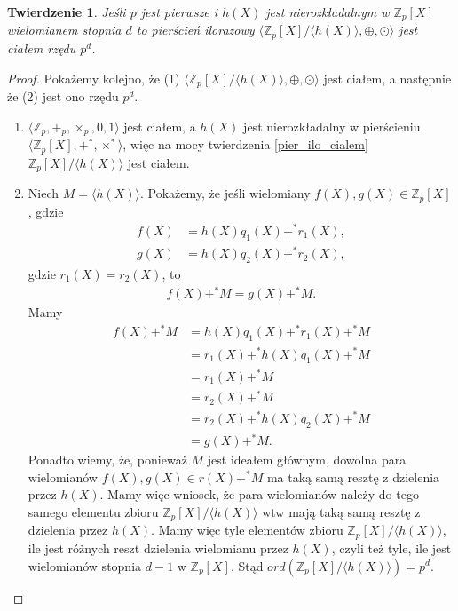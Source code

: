 \documentclass[declaration,shortabstract]{iithesis}
\theoremstyle{definition}
\theoremstyle{remark} \newtheorem{observation}{Obserwacja}
\theoremstyle{plain} \newtheorem{theorem}{Twierdzenie}
\theoremstyle{plain} \newtheorem{lemma}{Lemat}
\theoremstyle{remark} \newtheorem*{remark*}{Uwaga}
\theoremstyle{reminder} \newtheorem*{reminder*}{Przypomnienie}
\begin{document}
\begin{theorem} \label{pier_ilo_ciałem}
	Jeśli $p$ jest pierwsze i $h(X)$ jest nierozkładalnym w $\mathbb{Z}_p[X]$ wielomianem stopnia $d$ to pierścień ilorazowy $\langle \mathbb{Z}_p[X]/\langle h(X) \rangle, \oplus, \odot \rangle$ jest ciałem rzędu $p^d$.
\end{theorem}

\begin{proof}
    Pokażemy kolejno, że (1) $\langle \mathbb{Z}_p[X]/\langle h(X) \rangle, \oplus, \odot \rangle$ jest ciałem, a następnie że (2) jest ono rzędu $p^d$.
    \begin{enumerate}[label=(\arabic*),leftmargin=.4in]
        \item $\langle \mathbb{Z}_p, +_p, \times_p, 0, 1 \rangle$ jest ciałem, a $h(X)$ jest nierozkładalny w pierścieniu $\langle \mathbb{Z}_p[X], +^*, \times^* \rangle$, więc na mocy twierdzenia \ref{pier_ilo_cialem} $\mathbb{Z}_p[X]/\langle h(X) \rangle$ jest ciałem.
        \item Niech $M = \langle h(X) \rangle$. Pokażemy, że jeśli wielomiany $f(X), g(X) \in \mathbb{Z}_p[X]$, gdzie 
        \begin{align*}
            f(X) &= h(X)q_1(X) +^* r_1(X), \\
            g(X) &= h(X)q_2(X) +^* r_2(X),
        \end{align*}
        gdzie $r_1(X) = r_2(X)$, to 
        \begin{align*}
            f(X) +^* M = g(X) +^* M.
        \end{align*}
        Mamy 
        \begin{align*}
            f(X) +^* M &= h(X)q_1(X) +^* r_1(X) +^* M \\
            &= r_1(X) +^* h (X)q_1(X) +^* M \\
            &= r_1(X) +^* M \\
            &= r_2(X) +^* M \\
            &= r_2(X) +^* h(X)q_2(X) +^* M \\
            &= g(X) +^* M.
        \end{align*}
        Ponadto wiemy, że, ponieważ $M$ jest ideałem głównym, dowolna para wielomianów $f(X), g(X) \in r(X) +^* M$ ma taką samą resztę z dzielenia przez $h(X)$. Mamy więc wniosek, że para wielomianów należy do tego samego elementu zbioru $\mathbb{Z}_p[X]/\langle h(X) \rangle$ wtw mają taką samą resztę z dzielenia przez $h(X)$.\newline
        Mamy więc tyle elementów zbioru $\mathbb{Z}_p[X]/\langle h(X) \rangle$, ile jest różnych reszt dzielenia wielomianu przez $h(X)$, czyli też tyle, ile jest wielomianów stopnia $d-1$ w $\mathbb{Z}_p[X]$. Stąd $ord(\mathbb{Z}_p[X]/\langle h(X) \rangle) = p^d$.
    \end{enumerate}
\end{proof}
\end{document}
